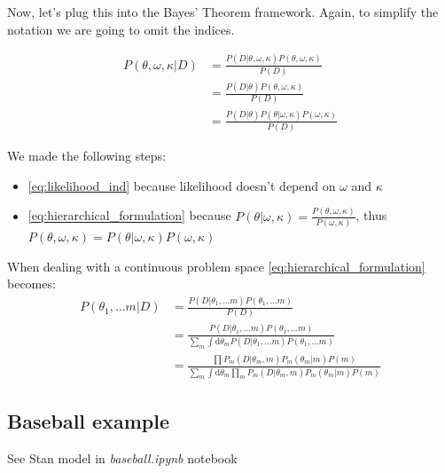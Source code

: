 \documentclass[11pt]{beamer}
\begin{document}
\begin{frame}
	Now, let's plug this into the Bayes' Theorem framework. Again, to simplify the notation we are going to omit the indices.
	
	\begin{align}
		P(\theta, \omega, \kappa | D) &= \frac{P(D | \theta, \omega, \kappa) P(\theta, \omega, \kappa)}{P(D)} \\
		&= \frac{P(D | \theta) P(\theta, \omega, \kappa)}{P(D)} \label{eq:likelihood_ind}\\
		&= \frac{P(D | \theta) P(\theta | \omega, \kappa) P(\omega, \kappa)}{P(D)} \label{eq:hierarchical_formulation}
	\end{align}
	
	We made the following steps:
	\begin{itemize}
		\item \eqref{eq:likelihood_ind} because likelihood doesn't depend on $\omega$ and $\kappa$
		\item \eqref{eq:hierarchical_formulation} because $P(\theta | \omega, \kappa) = \frac{P(\theta, \omega, \kappa)}{P(\omega, \kappa)}$, thus $P(\theta, \omega, \kappa) = P(\theta | \omega, \kappa) P(\omega, \kappa)$
	\end{itemize}
\end{frame}

\begin{frame}
	When dealing with a continuous problem space \eqref{eq:hierarchical_formulation} becomes:
	\begin{align}
		P(\theta_1, \dots m | D) &= \frac{P(D | \theta_1, \dots m) P(\theta_1, \dots m)}{P(D)} \\
		&= \frac{P(D | \theta_1, \dots m) P(\theta_1, \dots m)}{\sum\limits_{m} \int \mathrm{d}\theta_{m} P(D | \theta_1, \dots m) P(\theta_1, \dots m)} \\
		&= \frac{\prod P_{m}(D | \theta_{m}, m) P_{m}(\theta_{m} | m) P(m)}{\sum\limits_{m} \int \mathrm{d}\theta_{m} \prod_{m} P_{m}(D | \theta_{m}, m) P_{m}(\theta_{m} | m) P(m)}
	\end{align}		
\end{frame}


\subsection{Baseball example}
\begin{frame}
	See Stan model in \textit{baseball.ipynb} notebook
\end{frame}
\end{document}
